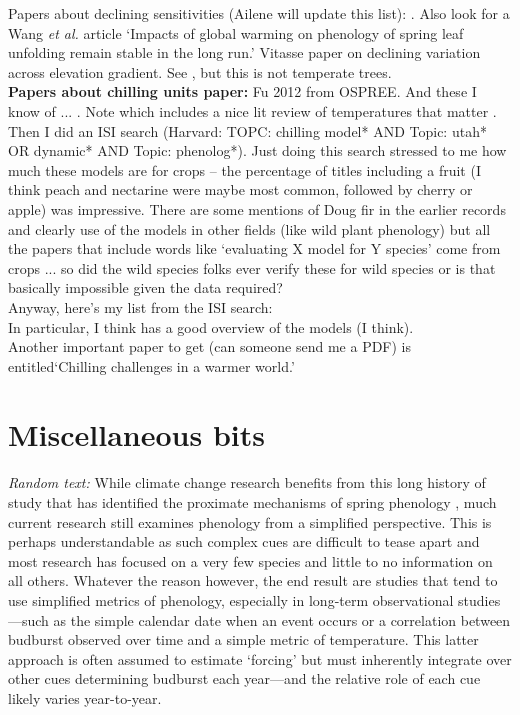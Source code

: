 \documentclass[11pt,letter]{article}
\begin{document}
Papers about declining sensitivities (Ailene will update this list): \cite{Rutishauser:2008fu,fu2015}. Also look for a Wang \emph{et al.} article `Impacts of global warming on phenology of spring leaf unfolding remain stable in the long run.' Vitasse paper on declining variation across elevation gradient. See \cite{yu2010}, but this is not temperate trees. \\

{\bf Papers about chilling units paper:} Fu 2012 from OSPREE. And these I know of ... \cite{harrington2015}\cite{lued2011,Luedeling:2011qe,Luedeling2013AgFM}. Note \citet{Harrington:2010} which includes a nice lit review of temperatures that matter \citep[][also has a good intro to dormancy]{harrington2015}. Then I did an ISI search (Harvard: TOPC: chilling model* AND Topic: utah* OR dynamic* AND Topic: phenolog*). Just doing this search stressed to me how much these models are for crops -- the percentage of titles including a fruit (I think peach and nectarine were maybe most common, followed by cherry or apple) was impressive. There are some mentions of Doug fir in the earlier records and clearly use of the models in other fields (like wild plant phenology) but all the papers that include words like `evaluating X model for Y species' come from crops ... so did the wild species folks ever verify these for wild species or is that basically impossible given the data required? \\

Anyway, here's my list from the ISI search: \cite{darby2016,Luedeling2015Acta,maulion2014,fu2014Plos,okie2011,anderson1992,Luedeling2009}\\

In particular, I think \citet{okie2011} has a good overview of the models (I think).\\

Another important paper to get (can someone send me a PDF) is \citet{Luedeling2015Acta} entitled`Chilling challenges in a warmer world.'




\section{Miscellaneous bits}


\emph{Random text:} While climate change research benefits from this long history of study that has identified the proximate mechanisms of spring phenology \citep{chuinearees}, much current research still examines phenology from a simplified perspective. This is perhaps understandable as such complex cues are difficult to tease apart and most research has focused on a very few species and little to no information on all others. Whatever the reason however, the end result are studies that tend to use simplified metrics of phenology, especially in long-term observational studies---such as the simple calendar date when an event occurs or a correlation between budburst observed over time and a simple metric of temperature. This latter approach is often assumed to estimate `forcing' but must inherently integrate over other cues determining budburst each year---and the relative role of each cue likely varies year-to-year. 
\end{document}
